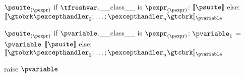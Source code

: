 \documentclass{article}
\begin{document}
\newsavebox{\exnBoxTwo}
\begin{lrbox}{\exnBoxTwo}
\begin{python}
$\psuite_{(\pexpr)}$
if $\tfreshvar$.__class__ is $\pexpr_{(\pexpr)}$:
  $\meaningof{\psuite}$
else:
  $\meaningof{\gtobrk \pexcepthandler_2; \ldots; \pexcepthandler_n \gtcbrk}_{\pvariable}$
\end{python}
\end{lrbox}

\begin{mathpar}
\end{mathpar}

\newsavebox{\exnBoxThree}
\begin{lrbox}{\exnBoxThree}
\begin{python}
$\psuite_{(\pexpr)}$
if $\pvariable$.__class__ is $\pexpr_{(\pexpr)}$:
  $\pvariable_1$ = $\pvariable$
  $\meaningof{\psuite}$
else:
  $\meaningof{\gtobrk \pexcepthandler_2; \ldots; \pexcepthandler_n \gtcbrk}_{\pvariable}$
\end{python}
\end{lrbox}

\begin{mathpar}
\end{mathpar}

\newsavebox{\exnBoxEmpty}
\begin{lrbox}{\exnBoxEmpty}
\begin{python}
raise $\pvariable$
\end{python}
\end{lrbox}

\begin{mathpar}
\end{mathpar}
\end{document}
